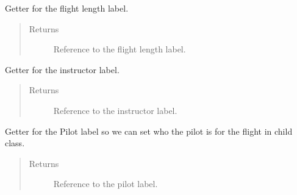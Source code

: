 \documentclass[letterpaper,10pt,english]{sphinxmanual}
\begin{document}
\begin{fulllineitems}
\begin{fulllineitems}
\begin{quote}
\begin{description}
\end{description}\end{quote}

\end{fulllineitems}


\begin{fulllineitems}
\label{\detokenize{index:src.Views.View_ReportScreen.ReportWindow.set_LblFlightLength}}
Getter for the flight length label.
\begin{quote}\begin{description}
\item[{Returns}] \leavevmode
Reference to the flight length label.

\end{description}\end{quote}

\end{fulllineitems}


\begin{fulllineitems}
\label{\detokenize{index:src.Views.View_ReportScreen.ReportWindow.set_LblInstructor}}
Getter for the instructor label.
\begin{quote}\begin{description}
\item[{Returns}] \leavevmode
Reference to the instructor label.

\end{description}\end{quote}

\end{fulllineitems}


\begin{fulllineitems}
\label{\detokenize{index:src.Views.View_ReportScreen.ReportWindow.set_LblPilot}}
Getter for the Pilot label so we can set who the pilot is for the flight in child class.
\begin{quote}\begin{description}
\item[{Returns}] \leavevmode
Reference to the pilot label.


\end{description}
\end{quote}
\end{fulllineitems}
\end{fulllineitems}
\end{document}
